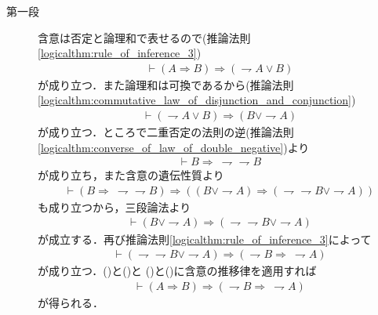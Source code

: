 	\begin{prf}\mbox{}
		\begin{description}
			\item[第一段]
				含意は否定と論理和で表せるので(推論法則\ref{logicalthm:rule_of_inference_3})
				\begin{align}
					\vdash (A \Longrightarrow B) \Longrightarrow (\rightharpoondown A \vee B)
					\label{eq:thm_contraposition_is_true_1}
				\end{align}
				が成り立つ．また論理和は可換であるから(推論法則\ref{logicalthm:commutative_law_of_disjunction_and_conjunction})
				\begin{align}
					\vdash (\rightharpoondown A \vee B) \Longrightarrow (B \vee \rightharpoondown A)
					\label{eq:thm_contraposition_is_true_2}
				\end{align}
				が成り立つ．ところで二重否定の法則の逆(推論法則\ref{logicalthm:converse_of_law_of_double_negative})より
				\begin{align}
					\vdash B \Longrightarrow\ \rightharpoondown \rightharpoondown B
				\end{align}
				が成り立ち，また含意の遺伝性質より
				\begin{align}
					\vdash (B \Longrightarrow\ \rightharpoondown \rightharpoondown B)
					\Longrightarrow ((B \vee \rightharpoondown A) 
					\Longrightarrow (\rightharpoondown \rightharpoondown B \vee \rightharpoondown A))
				\end{align}
				も成り立つから，三段論法より
				\begin{align}
					\vdash (B \vee \rightharpoondown A) 
					\Longrightarrow (\rightharpoondown \rightharpoondown B \vee \rightharpoondown A)
					\label{eq:thm_contraposition_is_true_3}
				\end{align}
				が成立する．再び推論法則\ref{logicalthm:rule_of_inference_3}によって
				\begin{align}
					\vdash (\rightharpoondown \rightharpoondown B \vee \rightharpoondown A)
					\Longrightarrow (\rightharpoondown B \Longrightarrow\ \rightharpoondown A)
					\label{eq:thm_contraposition_is_true_4}
				\end{align}
				が成り立つ．()と()と
				()と()に含意の推移律を適用すれば
				\begin{align}
					\vdash (A \Longrightarrow B) \Longrightarrow (\rightharpoondown B \Longrightarrow\ \rightharpoondown A)
				\end{align}
				が得られる．
				

\end{description}
\end{prf}
